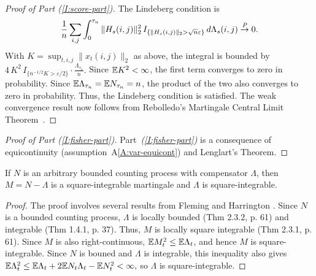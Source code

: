 \documentclass[aoas,preprint]{imsart}
\begin{document}
\begin{proof}[Proof of Part \textit{(\ref{I:score-part})}]
The Lindeberg condition is
\[
    \frac{1}{n}
    \sum_{i,j}
    \int_{0}^{\tau_n}
        \| H_s(i,j) \|_2^2
        \, I_{\{\| H_s(i,j) \|_2 > \sqrt{n} \varepsilon \}}
        \, d\Lambda_s(i,j)
        \overset{\mathit{P}}{\to}
        0.
\]
With $K = \sup_{t,i,j} \| x_t(i,j)\|_2$ as above, the integral is bounded by
\(
    4 \, K^2 \, I_{\{n^{-1/2} K > \varepsilon / 2\}}
    \cdot
    \frac{\Lambda_{\tau_n}}{n}.
\)
Since $\mathbb{E} K^2 < \infty$, the first term converges to zero in probability.
Since $\mathbb{E} \Lambda_{\tau_n} = \mathbb{E} N_{\tau_n} = n$, the product of the two also
converges to zero in probability.  Thus, the Lindeberg condition is satisfied.
The weak convergence result now follows from Rebolledo's Martingale Central
Limit Theorem~\cite{rebolledo1980central}.
\end{proof}

\begin{proof}[Proof of Part \textit{(\ref{I:fisher-part})}]
Part~\textit{(\ref{I:fisher-part})} is a consequence of equicontinuity (assumption~A\ref{A:var-equicont})
and Lenglart's Theorem. 
    
\end{proof}




\clearpage

\begin{lemma}\label{L:bouned-count-sqint}
    If $N$ is an arbitrary bounded counting process with compensator
    $\Lambda$, then $M = N - \Lambda$ is a square-integrable
    martingale and $\Lambda$ is square-integrable.
\end{lemma}
\begin{proof}
    The proof involves several results from Fleming and Harrington
    \cite{fleming1991counting}. Since $N$ is a bounded counting process,
    $\Lambda$ is locally bounded (Thm 2.3.2, p. 61) and
    integrable (Thm 1.4.1, p. 37).  Thus, $M$ is locally square integrable
    (Thm 2.3.1, p. 61).  Since $M$ is also right-continuous,
    $\mathbb{E} M^2_t \leq \mathbb{E} \Lambda_t$, and hence $M$ is square-integrable.
    Since $N$ is bouned and $\Lambda$ is integrable,
    this inequality also gives
    \(
        \mathbb{E} \Lambda_t^2
            \leq \mathbb{E} \Lambda_t + 2 \mathbb{E} N_t \Lambda_t - \mathbb{E} N_t^2
            < \infty,
    \)
    so $\Lambda$ is square-integrable.
\end{proof}
\end{document}

